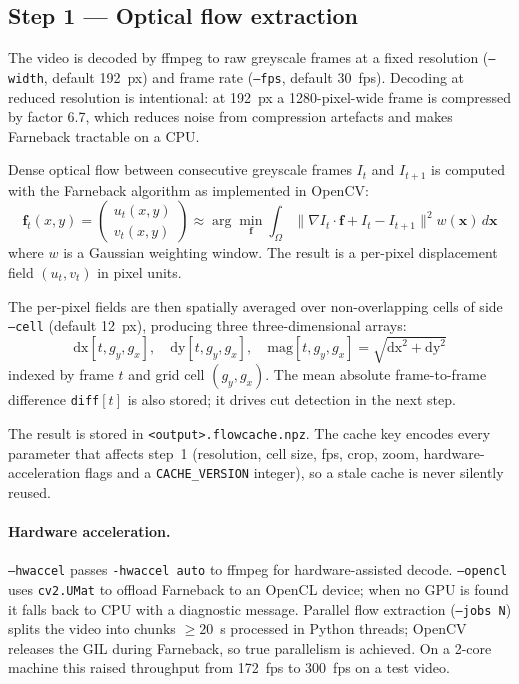 \documentclass[12pt,a4paper]{article}
\begin{document}
\subsection{Step 1 --- Optical flow extraction}
\label{sec:flow}

The video is decoded by ffmpeg to raw greyscale frames at a fixed resolution
(\texttt{--width}, default 192~px) and frame rate (\texttt{--fps}, default
30~fps). Decoding at reduced resolution is intentional: at 192~px a
1280-pixel-wide frame is compressed by factor 6.7, which reduces noise from
compression artefacts and makes Farneback tractable on a CPU.

Dense optical flow between consecutive greyscale frames
$I_t$ and $I_{t+1}$ is computed with the Farneback algorithm
\cite{farneback2003} as implemented in OpenCV:
\begin{equation}
  \mathbf{f}_t(x,y) = \begin{pmatrix} u_t(x,y) \\ v_t(x,y) \end{pmatrix}
  \approx \arg\min_{\mathbf{f}}
    \int_\Omega \!\bigl\|\nabla I_t \cdot \mathbf{f} + I_t - I_{t+1}\bigr\|^2
    w(\mathbf{x})\,d\mathbf{x}
\end{equation}
where $w$ is a Gaussian weighting window. The result is a per-pixel
displacement field $(u_t, v_t)$ in pixel units.

The per-pixel fields are then spatially averaged over non-overlapping cells of
side \texttt{--cell} (default 12~px), producing three three-dimensional arrays:
\begin{equation}
  \mathrm{dx}[t, g_y, g_x],\quad
  \mathrm{dy}[t, g_y, g_x],\quad
  \mathrm{mag}[t, g_y, g_x]
  = \sqrt{\mathrm{dx}^2 + \mathrm{dy}^2}
\end{equation}
indexed by frame $t$ and grid cell $(g_y, g_x)$. The mean absolute
frame-to-frame difference \texttt{diff}$[t]$ is also stored; it drives cut
detection in the next step.

The result is stored in \texttt{<output>.flowcache.npz}. The cache key encodes
every parameter that affects step~1 (resolution, cell size, fps, crop, zoom,
hardware-acceleration flags and a \texttt{CACHE\_VERSION} integer), so a stale
cache is never silently reused.

\paragraph{Hardware acceleration.}
\texttt{--hwaccel} passes \texttt{-hwaccel auto} to ffmpeg for hardware-assisted
decode. \texttt{--opencl} uses \texttt{cv2.UMat} to offload Farneback to an
OpenCL device; when no GPU is found it falls back to CPU with a diagnostic
message. Parallel flow extraction (\texttt{--jobs~N}) splits the video into
chunks $\geq 20$~s processed in Python threads; OpenCV releases the GIL during
Farneback, so true parallelism is achieved. On a 2-core machine this raised
throughput from 172~fps to 300~fps on a test video.
\end{document}
